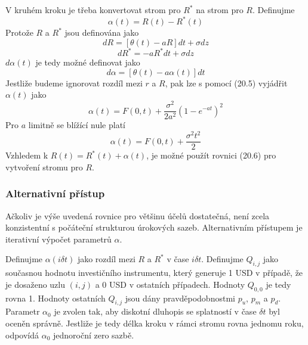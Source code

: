 \documentclass[a4paper]{book}
\begin{document}
V kruhém kroku je třeba konvertovat strom pro $R^*$ na strom pro $R$. Definujme
\begin{equation*}
\alpha (t) = R(t) - R^*(t)
\end{equation*}
Protože $R$ a $R^*$ jsou definována jako
\begin{equation*}
dR = [\theta(t) - aR]dt + \sigma dz
\end{equation*}
\begin{equation*}
dR^* = -aR^*dt + \sigma dz
\end{equation*}
$d \alpha(t)$ je tedy možné definovat jako
\begin{equation*}
d \alpha = [\theta(t) - a \alpha(t)]dt
\end{equation*}
Jestliže budeme ignorovat rozdíl mezi $r$ a $R$, pak lze s pomocí (20.5) vyjádřit $\alpha (t)$ jako
\begin{equation}
\alpha(t) = F(0,t) + \frac{\sigma^2}{2a^2}(1-e^{-at})^2
\end{equation}
Pro $a$ limitně se blížící nule platí
\begin{equation*}
\alpha (t) = F(0,t) + \frac{\sigma^2 t^2}{2}
\end{equation*}
Vzhledem k $R(t) = R^*(t) + \alpha(t)$, je možné použít rovnici (20.6) pro vytvoření stromu pro $R$.

\subsubsection{Alternativní přístup}

Ačkoliv je výše uvedená rovnice pro většinu účelů dostatečná, není zcela konzistentní s počáteční strukturou úrokových sazeb. Alternativním přístupem je iterativní výpočet parametrů $\alpha$.

Definujme $\alpha(i \delta t)$ jako rozdíl mezi $R$ a $R^*$ v čase $i \delta t$. Definujme $Q_{i,j}$ jako současnou hodnotu investičního instrumentu, který generuje 1 USD v případě, že je dosaženo uzlu $(i,j)$ a 0 USD v ostatních případech. Hodnoty $Q_{0,0}$ je tedy rovna 1. Hodnoty ostatních $Q_{i,j}$ jsou dány pravděpodobnostmi $p_u$, $p_m$ a $p_d$. Parametr $\alpha_0$ je zvolen tak, aby diskotní dluhopis se splatností v čase $\delta t$ byl oceněn správně. Jestliže je tedy délka kroku v rámci stromu rovna jednomu roku, odpovídá $\alpha_0$ jednoroční zero sazbě.
\end{document}
